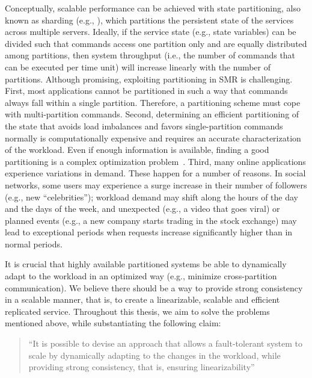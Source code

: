 Conceptually, scalable performance can be achieved with state partitioning, also
known as sharding (e.g., \cite{facebookTAO, sciascia2012sdur, Aguilera:2007}),
which partitions the persistent state of the services across multiple servers.
Ideally, if the service state (e.g., state variables) can be divided
such that commands access one partition only and are equally distributed among
partitions, then system throughput (i.e., the number of commands that can be
executed per time unit) will increase linearly with the number of partitions.
Although promising, exploiting partitioning in SMR is challenging. First, most
applications cannot be partitioned in such a way that commands always fall
within a single partition. Therefore, a partitioning scheme must cope with
multi-partition commands. Second, determining an efficient partitioning of the
state that avoids load imbalances and favors single-partition commands normally
is computationally expensive and requires an accurate characterization of the
workload. Even if enough information is available, finding a good partitioning
is a complex optimization problem~\cite{curino2010sch,taft2014est}. Third, many
online applications experience variations in demand. These happen for a number
of reasons. In social networks, some users may experience a surge increase in
their number of followers (e.g., new ``celebrities''); workload demand may shift
along the hours of the day and the days of the week, and unexpected (e.g., a
video that goes viral) or planned events (e.g., a new company starts trading in
the stock exchange) may lead to exceptional periods when requests increase
significantly higher than in normal periods. %

It is crucial that highly available partitioned systems be able to dynamically
adapt to the workload in an optimized way (e.g., minimize cross-partition
communication). We believe there should be a way to provide strong consistency
in a scalable manner, that is, to create a linearizable, scalable and efficient
replicated service. Throughout this thesis, we aim to solve the problems
mentioned above, while substantiating the following claim:

\begin{quote}
``It is possible to devise an approach that allows a fault-tolerant system to
scale by dynamically adapting to the changes in the workload, while providing
strong consistency, that is, ensuring linearizability''
\end{quote}


